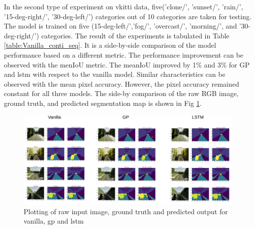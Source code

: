 	In the second type of experiment on vkitti data, five('clone/', 'sunset/', 'rain/', '15-deg-right/',
	'30-deg-left/') categories out of 10 categories are taken for testing. The model is trained on five (15-deg-left/','fog/', 'overcast/', 'morning/', and '30-deg-right/') categories. The result of the experiments is tabulated in Table \ref{table:Vanilla_conti_seq}. It is a side-by-side comparison of the model performance based on a different metric. The performance improvement can be observed with the menIoU metric. The meanIoU improved by 1\% and 3\% for GP and lstm with respect to the vanilla model. Similar characteristics can be observed with the mean pixel accuracy. However, the pixel accuracy remained constant for all three models. The side-by comparison of the raw RGB image, ground truth, and predicted segmentation map is shown in Fig \ref{fig:unet_side_by_side_five_classes}. 
	
	\begin{figure}
		\centering
		\includegraphics[width=17cm]{images/unet_vkitti_five.png}
		\caption{Plotting of raw input image, ground truth and predicted output for vanilla, gp and lstm}
		\label{fig:unet_side_by_side_five_classes}
	\end{figure}

